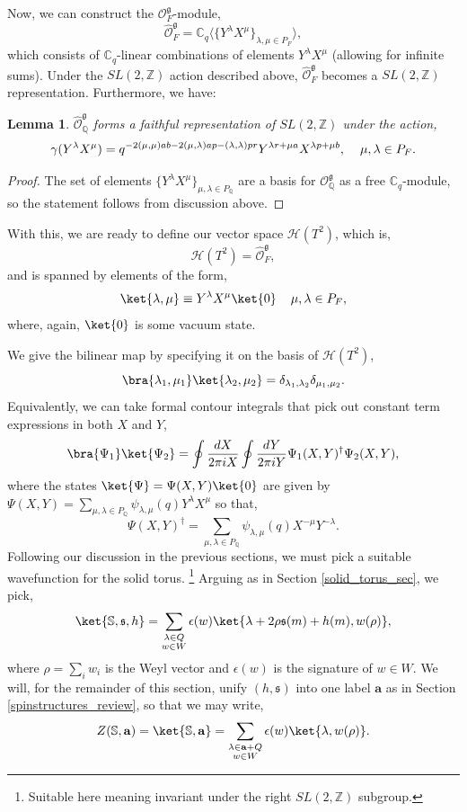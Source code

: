 \documentclass{article}
\newcommand{\Z}{{\mathbb Z}}
\newcommand{\C}{{\mathbb C}}
\def\be{\begin{equation}}
\def\ee{\end{equation}}
\newtheorem{lemma}[theorem]{Lemma}
\numberwithin{corollary}{theorem}
\numberwithin{corollary}{proposition}
\begin{document}
Now, we can construct the $\mathcal{O}^\mathfrak{g}_F$-module, $$\hat{\mathcal{O}}^\mathfrak{g}_F = \mathbb{C}_q \langle \{  Y^\lambda X^\mu\}_{\lambda,\mu \in P_F}\rangle,$$
which consists of $\C_q$-linear combinations of elements $Y^\lambda X^\mu$ (allowing for infinite sums). Under the $SL(2,\Z)$ action described above, $\hat{\mathcal{O}}^\mathfrak{g}_F$ becomes a $SL(2,\Z)$ representation. Furthermore, we have:
\begin{lemma}
$\hat{\mathcal{O}}^\mathfrak{g}_\mathbb{Q}$ forms a faithful representation of $SL(2,\mathbb{Z})$ under the action,
$$\gamma(Y^\lambda X^\mu) = q^{-2(\mu,\mu)ab -2 (\mu,\lambda)ap -(\lambda,\lambda)pr} Y^{\lambda r+\mu a } X^{\lambda p + \mu b}, \hspace{4mm} \mu,\lambda \in P_F.$$
\end{lemma}
\begin{proof}
    The set of elements $\{ Y^\lambda X^\mu\}_{\mu,\lambda\in P_\mathbb{Q}}$ are a basis for $\mathcal{O}^\mathfrak{g}_\mathbb{Q}$ as a free $\mathbb{C}_q$-module, so the statement follows from discussion above.
\end{proof}

With this, we are ready to define our vector space $\mathcal{H}(T^{2})$, which is, 
$$\mathcal{H}(T^{2}) = \hat{\mathcal{O}}^\mathfrak{g}_F,$$
and is spanned by elements of the form,
\be \label{states_general_g} \ket{\lambda,\mu} \equiv Y^\lambda X^\mu \ket{0}\hspace{4mm} \mu,\lambda \in P_F,\ee
where, again, $\ket{0}$ is some vacuum state.

We give the bilinear map by specifying it on the basis of $\mathcal{H}(T^{2})$,
$$\bra{\lambda_1,\mu_1}\ket{\lambda_2,\mu_2} = \delta_{\lambda_1,\lambda_2}\delta_{\mu_1,\mu_2}.$$
Equivalently, we can take formal contour integrals that pick out constant term expressions in both $X$ and $Y$, 
$$\bra{\Psi_1}\ket{\Psi_2} = \oint \frac{dX}{2\pi i X}\oint \frac{dY}{2\pi i Y} \Psi_1(X,Y)^\dagger \Psi_2(X,Y),$$
where the states $\ket{\Psi} = \Psi(X,Y)\ket{0}$ are given by $\Psi(X,Y) = \sum_{\mu,\lambda\in P_\mathbb{Q}} \psi_{\lambda,\mu}(q) Y^\lambda X^\mu $ so that,
$$\Psi(X,Y)^\dagger = \sum_{\mu,\lambda\in P_\mathbb{Q}} \psi_{\lambda,\mu}(q) X^{-\mu} Y^{-\lambda} .$$
Following our discussion in the previous sections, we must pick a suitable wavefunction for the solid torus. \footnote{Suitable here meaning invariant under the right $SL(2,\mathbb{Z})$ subgroup.} Arguing as in Section \ref{solid_torus_sec}, we pick, 
\be \label{highranksolidtorus} \ket{\mathbb{S}, \mathfrak{s}, h} = \sum_{\substack{ \lambda\in Q \\ w\in W }}  \epsilon(w) \ket{\lambda + 2 \rho \mathfrak{s}(m) + h(m) ,w(\rho)},\ee 
where $\rho = \sum_i w_i$ is the Weyl vector and $\epsilon(w)$ is the signature of $w\in W$. We will, for the remainder of this section, unify $(h,\mathfrak{s})$ into one label $\mathbf{a}$ as in Section \ref{spinstructures_review}, so that we may write, 
$$Z(\mathbb{S}, \mathbf{a}) =\ket{\mathbb{S}, \mathbf{a}} = \sum_{\substack{ \lambda\in \mathbf{a} + Q \\ w\in W }}  \epsilon(w) \ket{\lambda,w(\rho)}.$$
\end{document}
